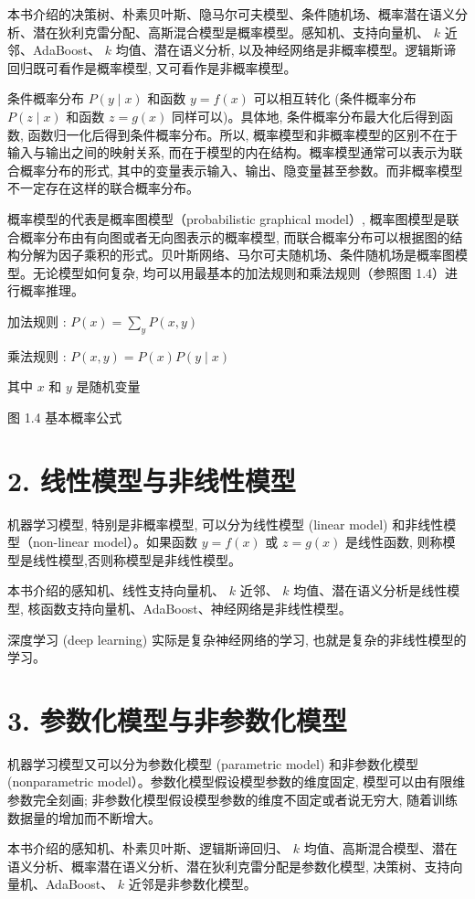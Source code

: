 \documentclass[10pt]{article}
\begin{document}
\begin{CJK*}{UTF8}{bsmi}
本书介绍的决策树、朴素贝叶斯、隐马尔可夫模型、条件随机场、概率潜在语义分析、潜在狄利克雷分配、高斯混合模型是概率模型。感知机、支持向量机、 $k$ 近邻、AdaBoost、 $k$ 均值、潜在语义分析, 以及神经网络是非概率模型。逻辑斯谛回归既可看作是概率模型, 又可看作是非概率模型。

条件概率分布 $P(y \mid x)$ 和函数 $y=f(x)$ 可以相互转化 (条件概率分布 $P(z \mid x)$ 和函数 $z=g(x)$ 同样可以)。具体地, 条件概率分布最大化后得到函数, 函数归一化后得到条件概率分布。所以, 概率模型和非概率模型的区别不在于输入与输出之间的映射关系, 而在于模型的内在结构。概率模型通常可以表示为联合概率分布的形式, 其中的变量表示输入、输出、隐变量甚至参数。而非概率模型不一定存在这样的联合概率分布。

概率模型的代表是概率图模型（probabilistic graphical model）, 概率图模型是联合概率分布由有向图或者无向图表示的概率模型, 而联合概率分布可以根据图的结构分解为因子乘积的形式。贝叶斯网络、马尔可夫随机场、条件随机场是概率图模型。无论模型如何复杂, 均可以用最基本的加法规则和乘法规则（参照图 1.4）进行概率推理。

加法规则 : $P(x)=\sum_{y} P(x, y)$

乘法规则 : $P(x, y)=P(x) P(y \mid x)$

其中 $x$ 和 $y$ 是随机变量

图 1.4 基本概率公式

\section*{2. 线性模型与非线性模型}
机器学习模型, 特别是非概率模型, 可以分为线性模型 (linear model) 和非线性模型（non-linear model）。如果函数 $y=f(x)$ 或 $z=g(x)$ 是线性函数, 则称模型是线性模型,否则称模型是非线性模型。

本书介绍的感知机、线性支持向量机、 $k$ 近邻、 $k$ 均值、潜在语义分析是线性模型, 核函数支持向量机、AdaBoost、神经网络是非线性模型。

深度学习 (deep learning) 实际是复杂神经网络的学习, 也就是复杂的非线性模型的学习。

\section*{3. 参数化模型与非参数化模型}
机器学习模型又可以分为参数化模型 (parametric model) 和非参数化模型 (nonparametric model）。参数化模型假设模型参数的维度固定, 模型可以由有限维参数完全刻画; 非参数化模型假设模型参数的维度不固定或者说无穷大, 随着训练数据量的增加而不断增大。

本书介绍的感知机、朴素贝叶斯、逻辑斯谛回归、 $k$ 均值、高斯混合模型、潜在语义分析、概率潜在语义分析、潜在狄利克雷分配是参数化模型, 决策树、支持向量机、AdaBoost、 $k$ 近邻是非参数化模型。


\end{CJK*}
\end{document}

